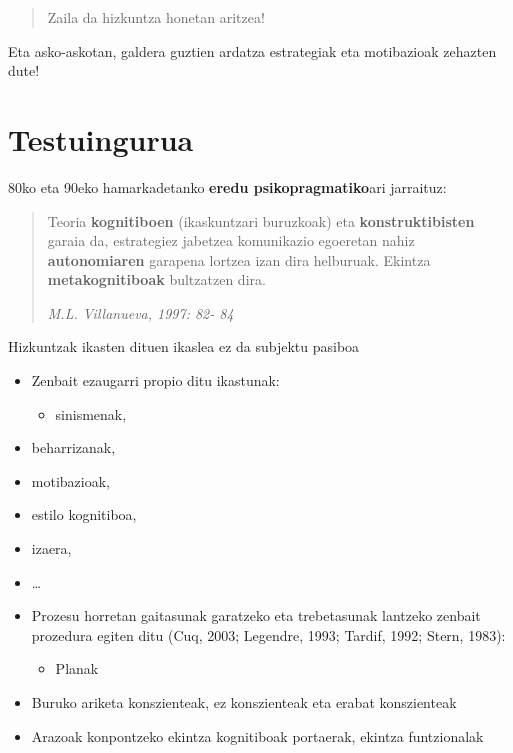 \documentclass[
]{book}
\providecommand{\tightlist}{%
  \setlength{\itemsep}{0pt}\setlength{\parskip}{0pt}}
\begin{document}
\begin{quote}
Zaila da hizkuntza honetan aritzea!
\end{quote}

Eta asko-askotan, galdera guztien ardatza estrategiak eta motibazioak zehazten dute!

\hypertarget{testuingurua}{%
\section{Testuingurua}\label{testuingurua}}

80ko eta 90eko hamarkadetanko \textbf{eredu psikopragmatiko}ari jarraituz:

\begin{quote}
Teoria \textbf{kognitiboen} (ikaskuntzari buruzkoak) eta \textbf{konstruktibisten} garaia da, estrategiez jabetzea komunikazio egoeretan nahiz \textbf{autonomiaren} garapena lortzea izan dira helburuak. Ekintza \textbf{metakognitiboak} bultzatzen dira.

\emph{M.L. Villanueva, 1997: 82- 84}
\end{quote}

Hizkuntzak ikasten dituen ikaslea ez da subjektu pasiboa

\begin{itemize}
\tightlist
\item
  Zenbait ezaugarri propio ditu ikastunak:

  \begin{itemize}
  \tightlist
  \item
    sinismenak,
  \end{itemize}
\item
  beharrizanak,
\item
  motibazioak,
\item
  estilo kognitiboa,
\item
  izaera,
\item
  \ldots{}
\item
  Prozesu horretan gaitasunak garatzeko eta trebetasunak lantzeko zenbait prozedura egiten ditu (Cuq, 2003; Legendre, 1993; Tardif, 1992; Stern, 1983):

  \begin{itemize}
  \tightlist
  \item
    Planak
  \end{itemize}
\item
  Buruko ariketa konszienteak, ez konszienteak eta erabat konszienteak
\item
  Arazoak konpontzeko ekintza kognitiboak portaerak, ekintza funtzionalak
\end{itemize}
\end{document}
